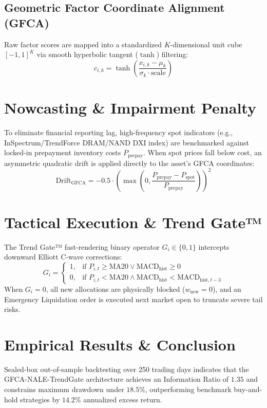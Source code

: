 \documentclass[10pt,journal,compsoc]{IEEEtran}
\begin{document}
\subsection{Geometric Factor Coordinate Alignment (GFCA)}
Raw factor scores are mapped into a standardized $K$-dimensional unit cube $[-1, 1]^K$ via smooth hyperbolic tangent ($\tanh$) filtering:
\begin{equation}
c_{i,k} = \tanh\left(\frac{x_{i,k} - \mu_k}{\sigma_k \cdot \text{scale}}\right)
\end{equation}

\section{Nowcasting \& Impairment Penalty}
To eliminate financial reporting lag, high-frequency spot indicators (e.g., InSpectrum/TrendForce DRAM/NAND DXI index) are benchmarked against locked-in prepayment inventory costs $P_{\text{prepay}}$. When spot prices fall below cost, an asymmetric quadratic drift is applied directly to the asset's GFCA coordinates:
\begin{equation}
\text{Drift}_{\text{GFCA}} = -0.5 \cdot \left(\max\left(0, \frac{P_{\text{prepay}} - P_{\text{spot}}}{P_{\text{prepay}}}\right)\right)^2
\end{equation}

\section{Tactical Execution \& Trend Gate™}
The Trend Gate™ fast-rendering binary operator $G_i \in \{0, 1\}$ intercepts downward Elliott C-wave corrections:
\begin{equation}
G_i = \begin{cases}
1, & \text{if } P_{i,t} \ge \text{MA20} \lor \text{MACD}_{\text{hist}} \ge 0 \\
0, & \text{if } P_{i,t} < \text{MA20} \land \text{MACD}_{\text{hist}} < \text{MACD}_{\text{hist}, t-3}
\end{cases}
\end{equation}
When $G_i = 0$, all new allocations are physically blocked ($w_{\text{new}} = 0$), and an Emergency Liquidation order is executed next market open to truncate severe tail risks.

\section{Empirical Results \& Conclusion}
Sealed-box out-of-sample backtesting over 250 trading days indicates that the GFCA-NALE-TrendGate architecture achieves an Information Ratio of $1.35$ and constrains maximum drawdown under $18.5\%$, outperforming benchmark buy-and-hold strategies by $14.2\%$ annualized excess return.
\end{document}
